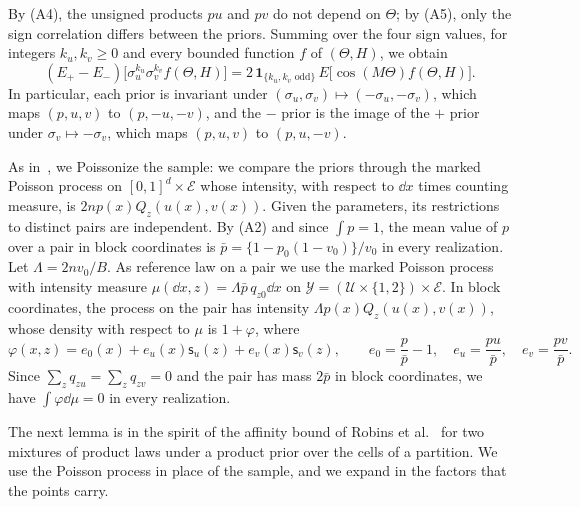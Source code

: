 By (A4), the unsigned products $pu$ and $pv$ do not depend on $\Theta$;
by (A5), only the sign correlation differs between the priors.
Summing over the four sign values, for integers $k_u,k_v\ge0$ and every
bounded function $f$ of $(\Theta,H)$, we obtain
\begin{equation}\label{lo:sign-difference}
 (E_+-E_-)\bigl[\sigma_u^{k_u}\sigma_v^{k_v}f(\Theta,H)\bigr]
 =2\,\mathbf 1_{\{k_u,k_v\text{ odd}\}}\,E\bigl[\cos(M\Theta)f(\Theta,H)\bigr].
\end{equation}
In particular, each prior is invariant under
$(\sigma_u,\sigma_v)\mapsto(-\sigma_u,-\sigma_v)$, which maps $(p,u,v)$
to $(p,-u,-v)$, and the $-$ prior is the image of the $+$ prior under
$\sigma_v\mapsto-\sigma_v$, which maps $(p,u,v)$ to $(p,u,-v)$.

As in~\cite{jiaovenkathanweissman,wuyangentropy,aronowlopatto}, we
Poissonize the sample: we compare the priors through the marked Poisson
process on $[0,1]^d\times\mathcal E$ whose intensity, with respect to $\dd x$
times counting measure, is $2np(x)Q_z(u(x),v(x))$. Given the
parameters, its restrictions to distinct pairs are independent. By (A2)
and since $\int p=1$, the mean value of $p$ over a pair in block
coordinates is $\bar p=\{1-p_0(1-v_0)\}/v_0$ in every realization. Let
$\Lambda=2nv_0/B$. As reference law on a pair we use the marked Poisson
process with intensity measure $\mu(\dd x,z)=\Lambda\bar p\,q_{z0}\dd x$
on $\mathcal Y=(\mathcal U\times\{1,2\})\times\mathcal E$. In block
coordinates, the process on the pair has intensity
$\Lambda p(x)Q_z(u(x),v(x))$, whose density with respect to $\mu$ is
$1+\varphi$, where
\begin{equation}\label{eq:poisson-point-factor}
 \varphi(x,z)=e_0(x)+e_u(x)\mathsf s_u(z)+e_v(x)\mathsf s_v(z),\qquad
 e_0=\frac p{\bar p}-1,\quad e_u=\frac{pu}{\bar p},\quad e_v=\frac{pv}{\bar p}.
\end{equation}
Since $\sum_zq_{zu}=\sum_zq_{zv}=0$ and the pair has mass $2\bar p$ in
block coordinates, we have $\int\varphi\dd\mu=0$ in every realization.

The next lemma is in the spirit of the affinity bound of Robins et
al.~\cite[Theorem~2.1]{robins2009} for two mixtures of product laws
under a product prior over the cells of a partition. We use the
Poisson process in place of the sample, and we expand in the factors that
the points carry.

